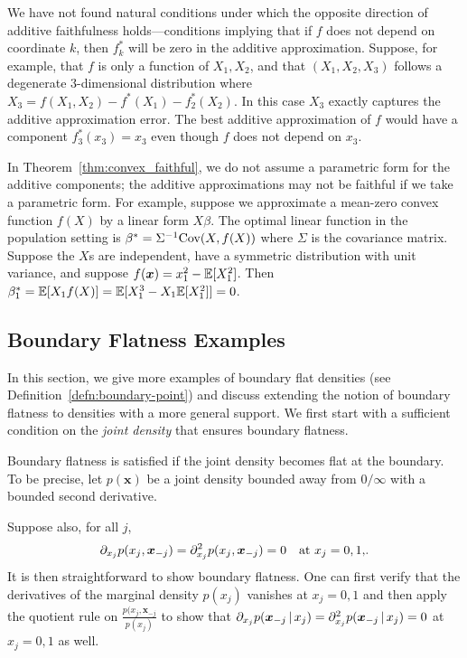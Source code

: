 \begin{remark} 
  We have not found natural conditions under which the opposite
  direction of additive faithfulness holds---conditions implying that if $f$ does not
  depend on coordinate $k$, then $f_k^*$ will be zero in the additive
  approximation.  Suppose, for example, that $f$ is only a
  function of $X_1, X_2$, and that $(X_1, X_2, X_3)$ follows a
  degenerate 3-dimensional distribution where $X_3 = f(X_1, X_2) -
  f^*(X_1) - f^*_2(X_2)$.  In this case $X_3$ exactly captures the
  additive approximation error.  The best additive
  approximation of $f$ would have a component $f^*_3(x_3) = x_3$ even
  though $f$ does not depend on $x_3$.
\end{remark}


\begin{remark}
In Theorem~\ref{thm:convex_faithful}, we do not assume a parametric
form for the additive components; the additive approximations may not
be faithful if we take a parametric form. For example, suppose we
approximate a mean-zero convex function $f(X)$ by a linear form $X
\beta$. The optimal linear function in the population setting is
$\beta^* = \Sigma^{-1} \textrm{Cov}(X, f(X))$ where $\Sigma$ is the
covariance matrix. Suppose the $X$s are independent, have a
symmetric distribution with unit variance, and suppose $f(\mbox{\boldmath $x$})
= x_1^2 - {\mathbb E}[X_1^2]$. Then $\beta^*_1 = {\mathbb E}[ X_1 f(X)] = {\mathbb E}[ X_1^3 -
  X_1 {\mathbb E}[X_1^2]] = 0$.
\end{remark}

\subsection{Boundary Flatness Examples}
\label{sec:boundary_flat}

In this section, we give more examples of boundary flat densities (see
Definition~\ref{defn:boundary-point}) and discuss extending the notion
of boundary flatness to densities with a more general support. We
first start with a sufficient condition on the \emph{joint density}
that ensures boundary flatness.

\begin{example}
\label{ex:joint_density_flat}
Boundary flatness is satisfied if the joint density becomes flat at the boundary. To be precise, let $p(\mathbf{x})$ be a joint density bounded away from $0/\infty$ with a bounded second derivative.

Suppose also, for all $j$,
$$
\partial_{x_j} p(x_j,\mbox{\boldmath $x$}_{-j}) =
\partial_{x_j}^2 p(x_j, \mbox{\boldmath $x$}_{-j}) = 0\quad  \textrm{at $x_j = 0, 1$,}.
$$
It is then straightforward to show boundary flatness. One can first verify that the derivatives of the marginal density $p(x_j)$ vanishes at $x_j = 0,1$ and then apply the quotient rule on $\frac{p(x_j,\mathbf{x}_{-j}}{p(x_j)}$ to show that $\partial_{x_j} p(\mbox{\boldmath $x$}_{-j} {\,|\,} x_j) = \partial_{x_j}^2 p(\mbox{\boldmath $x$}_{-j} {\,|\,} x_j) = 0$ at $x_j = 0,1$ as well. 
\end{example}

